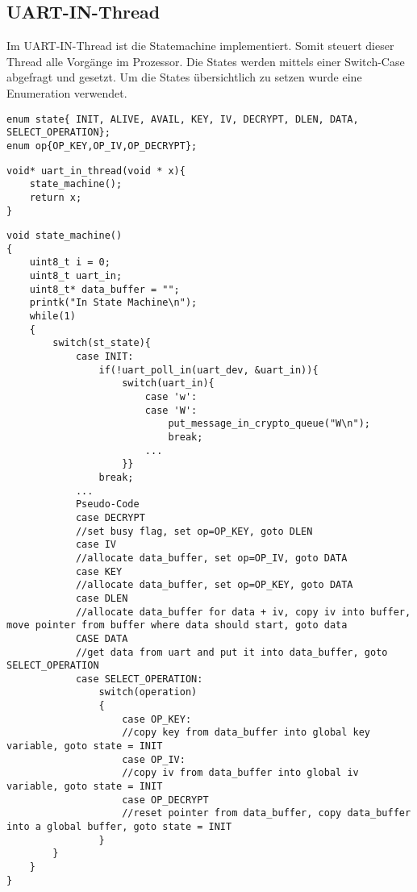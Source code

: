 \subsection{UART-IN-Thread}
    Im UART-IN-Thread ist die Statemachine implementiert. Somit steuert dieser Thread alle Vorgänge im Prozessor. 
    Die States werden mittels einer Switch-Case abgefragt und gesetzt. 
    Um die States übersichtlich zu setzen wurde eine Enumeration verwendet. 
    \begin{lstlisting}[style=StyleC, captionpos=b, caption=Statemachine-Enumerations, label=Statemachine-Enumerations]
enum state{ INIT, ALIVE, AVAIL, KEY, IV, DECRYPT, DLEN, DATA, SELECT_OPERATION};
enum op{OP_KEY,OP_IV,OP_DECRYPT};
    \end{lstlisting}
    \begin{lstlisting}[style=StyleC, captionpos=b, caption=UART-IN-Thread, label=UART-IN-Thread]
void* uart_in_thread(void * x){
    state_machine();
    return x;
}
\end{lstlisting}
\newpage
    \begin{lstlisting}[style=StyleC, captionpos=b, caption=Statemachine, label=Statemachine, tabsize=1]
void state_machine()
{
    uint8_t i = 0;
    uint8_t uart_in;
    uint8_t* data_buffer = "";
    printk("In State Machine\n");
    while(1)
    {
        switch(st_state){
            case INIT: 
                if(!uart_poll_in(uart_dev, &uart_in)){
                    switch(uart_in){
                        case 'w':
                        case 'W':
                            put_message_in_crypto_queue("W\n");
                            break;
                        ...
                    }}
                break; 
            ...
            Pseudo-Code
            case DECRYPT
            //set busy flag, set op=OP_KEY, goto DLEN 
            case IV 
            //allocate data_buffer, set op=OP_IV, goto DATA
            case KEY 
            //allocate data_buffer, set op=OP_KEY, goto DATA
            case DLEN 
            //allocate data_buffer for data + iv, copy iv into buffer, move pointer from buffer where data should start, goto data
            CASE DATA 
            //get data from uart and put it into data_buffer, goto SELECT_OPERATION
            case SELECT_OPERATION: 
                switch(operation)
                {
                    case OP_KEY: 
                    //copy key from data_buffer into global key variable, goto state = INIT
                    case OP_IV: 
                    //copy iv from data_buffer into global iv variable, goto state = INIT
                    case OP_DECRYPT
                    //reset pointer from data_buffer, copy data_buffer into a global buffer, goto state = INIT
                }
        }
    }
}
    \end{lstlisting}




